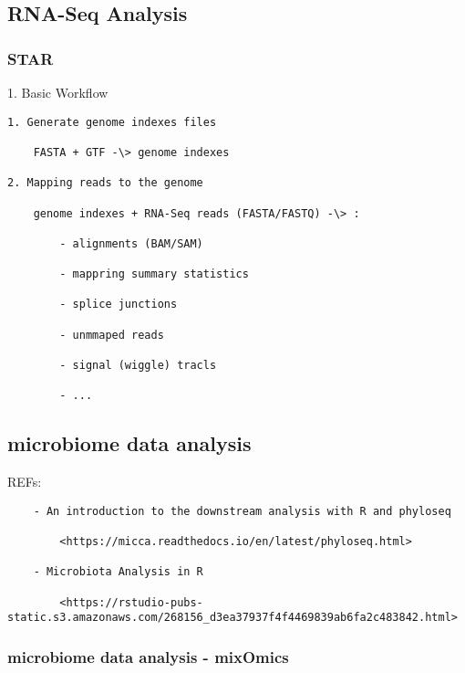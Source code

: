\documentclass[
]{book}
\begin{document}
\hypertarget{rna-seq-analysis}{%
\subsection{RNA-Seq Analysis}\label{rna-seq-analysis}}

\hypertarget{star}{%
\subsubsection{STAR}\label{star}}

1. Basic Workflow

\begin{verbatim}
1. Generate genome indexes files

    FASTA + GTF -\> genome indexes

2. Mapping reads to the genome

    genome indexes + RNA-Seq reads (FASTA/FASTQ) -\> :

        - alignments (BAM/SAM)

        - mappring summary statistics

        - splice junctions

        - unmmaped reads

        - signal (wiggle) tracls

        - ...
\end{verbatim}

\hypertarget{microbiome-data-analysis}{%
\subsection{microbiome data analysis}\label{microbiome-data-analysis}}

REFs:

\begin{verbatim}
    - An introduction to the downstream analysis with R and phyloseq

        <https://micca.readthedocs.io/en/latest/phyloseq.html>

    - Microbiota Analysis in R

        <https://rstudio-pubs-static.s3.amazonaws.com/268156_d3ea37937f4f4469839ab6fa2c483842.html>
\end{verbatim}

\hypertarget{microbiome-data-analysis---mixomics}{%
\subsubsection{microbiome data analysis - mixOmics}\label{microbiome-data-analysis---mixomics}}
\end{document}
